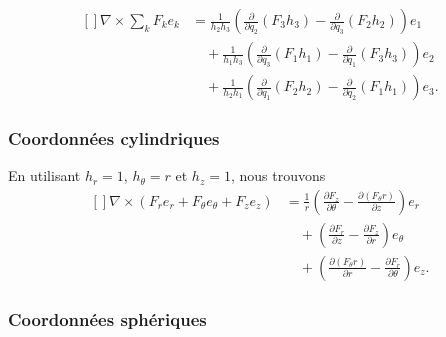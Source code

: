 \begin{equation}
	\begin{aligned}[]
		\nabla\times\sum_k F_ke_k & =\frac{1}{ h_2h_3 }\left( \frac{ \partial  }{ \partial q_2 }(F_3h_3)-\frac{ \partial  }{ \partial q_3 }(F_2h_2) \right)e_1       \\
		                          & \quad+\frac{1}{ h_1h_3 }\left( \frac{ \partial  }{ \partial q_3 }(F_1h_1)-\frac{ \partial  }{ \partial q_1 }(F_3h_3) \right)e_2  \\
		                          & \quad+\frac{1}{ h_2h_1 }\left( \frac{ \partial  }{ \partial q_1 }(F_2h_2)-\frac{ \partial  }{ \partial q_2 }(F_1h_1) \right)e_3.
	\end{aligned}
\end{equation}

\subsubsection{Coordonnées cylindriques}

En utilisant \( h_r=1\), \( h_{\theta}=r\) et \( h_z=1\), nous trouvons
\begin{equation}        \label{EqRotationnelCylin}
	\begin{aligned}[]
		\nabla\times(F_re_r+F_{\theta}e_{\theta}+F_ze_z) & =\frac{1}{ r }\left( \frac{ \partial F_z }{ \partial \theta }-\frac{ \partial (F_{\theta}r) }{ \partial z } \right)e_r \\
		                                                 & \quad+\left( \frac{ \partial F_r }{ \partial z }-\frac{ \partial F_z }{ \partial r } \right)e_{\theta}                 \\
		                                                 & \quad+\left( \frac{ \partial (F_{\theta} r) }{ \partial r }-\frac{ \partial F_r }{ \partial \theta } \right)e_z.
	\end{aligned}
\end{equation}

\subsubsection{Coordonnées sphériques}

